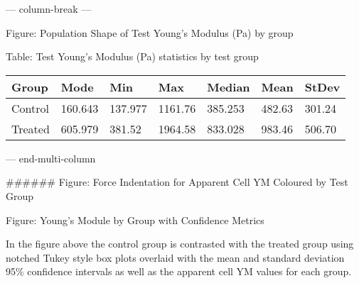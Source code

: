 \documentclass[
  paper=a4,
  ,captions=tableheading
]{scrartcl}
\makeatletter
\newcommand*\pandocbounded[1]{%
  \sbox\pandoc@box{#1}%
  \Gscale@div\@tempa{\textheight}{\dimexpr\ht\pandoc@box+\dp\pandoc@box\relax}%
  \Gscale@div\@tempb{\linewidth}{\wd\pandoc@box}%
  \ifdim\@tempb\p@<\@tempa\p@\let\@tempa\@tempb\fi%
  \ifdim\@tempa\p@<\p@\scalebox{\@tempa}{\usebox\pandoc@box}%
  \else\usebox{\pandoc@box}%
  \fi%
}
\makeatother
\begin{document}
--- column-break ---

Figure: Population Shape of Test Young's Modulus (Pa) by group

\begin{figure}
\centering
\pandocbounded{}
\caption{}
\end{figure}

Table: Test Young's Modulus (Pa) statistics by test group

\begin{longtable}[]{@{}lllllll@{}}
\toprule\noalign{}
Group & Mode & Min & Max & Median & Mean & StDev \\
\midrule\noalign{}
\endhead
\bottomrule\noalign{}
\endlastfoot
Control & 160.643 & 137.977 & 1161.76 & 385.253 & 482.63 & 301.24 \\
Treated & 605.979 & 381.52 & 1964.58 & 833.028 & 983.46 & 506.70 \\
\end{longtable}

--- end-multi-column

\#\#\#\#\#\# Figure: Force Indentation for Apparent Cell YM Coloured by
Test Group

\pandocbounded{}

Figure: Young's Module by Group with Confidence Metrics

\pandocbounded{}

In the figure above the control group is contrasted with the treated
group using notched Tukey style box plots overlaid with the mean and
standard deviation 95\% confidence intervals as well as the apparent
cell YM values for each group.

\pandocbounded{}\pandocbounded{}
\end{document}
